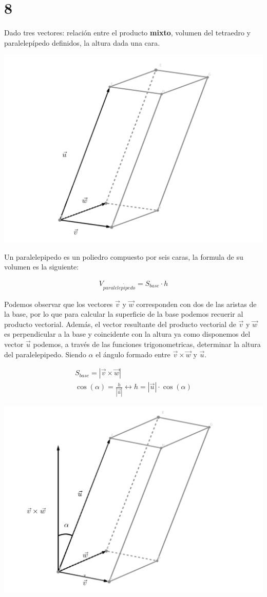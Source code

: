 \documentclass[
	12pt, %
	spanish, %
]{fphw}
\newcommand{\vu}{\vec{u}}
\newcommand{\vv}{\vec{v}}
\newcommand{\vw}{\vec{w}}
\begin{document}
\section*{8}
\begin{problem}
	Dado tres vectores: relación entre el producto \textbf{mixto}, volumen del
tetraedro y paralelepípedo definidos, la altura dada una cara.
\end{problem}

\begin{center}
	\includegraphics[width=0.5\columnwidth]{Paralelepipedo.png} %
\end{center}

Un paralelepipedo es un poliedro compuesto por seis caras, la formula de su volumen es la siguiente:

\begin{gather*}
	V_{paralelep\acute{i}pedo} = S_{base} \cdot h
\end{gather*}

Podemos observar que los vectores $\vv$ y $\vw$ corresponden con dos de las aristas de la base, por lo que para calcular la superficie de la base podemos recuerir al producto vectorial. Además, el vector resultante del producto vectorial de $\vv$ y $\vw$ es perpendicular a la base y  coincidente con la altura  ya  como disponemos del vector $\vu$ podemos, a través de las funciones trigonometricas, determinar la altura del paralelepipedo. Siendo $\alpha$ el ángulo formado entre $\vv \times \vw$ y $\vu$.

\begin{gather*}
	S_{base} = |\vv \times \vw|\\
	\cos(\alpha) = \frac{h}{|\vu|} \leftrightarrow h=|\vu| \cdot \cos(\alpha) 
\end{gather*}
 

\begin{center}
	\includegraphics[width=0.6\columnwidth]{geogebra-export.png} %
\end{center}
\end{document}
